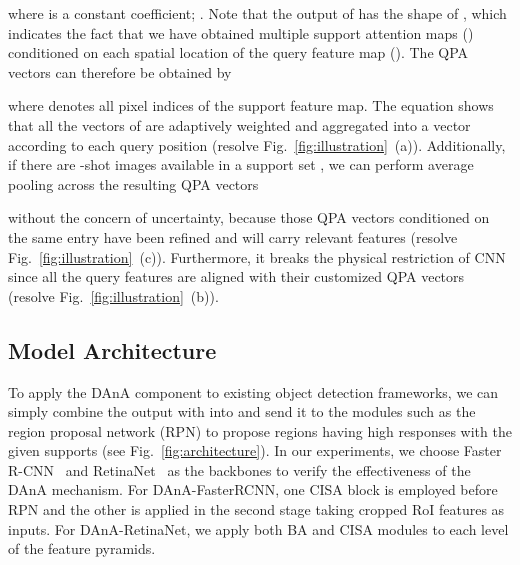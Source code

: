 \documentclass[journal]{IEEEtran}
\begin{document}
where  is a constant coefficient; .
Note that the output of  has the shape of , which indicates the fact that we have obtained multiple support attention maps () conditioned on each spatial location of the query feature map ().
The QPA vectors can therefore be obtained by

where  denotes all pixel indices of the support feature map.
The equation shows that all the vectors of  are adaptively weighted and aggregated into a vector  according to each query position  (resolve Fig.~\ref{fig:illustration}~(a)).
Additionally, if there are -shot images available in a support set , we can perform average pooling across the resulting QPA vectors

without the concern of uncertainty, because those QPA vectors  conditioned on the same entry  have been refined and will carry relevant features (resolve Fig.~\ref{fig:illustration}~(c)).
Furthermore, it breaks the physical restriction of CNN since all the query features are aligned with their customized QPA vectors (resolve Fig.~\ref{fig:illustration}~(b)). 


\subsection{Model Architecture}
\label{section:model_architecture}
To apply the DAnA component to existing object detection frameworks, we can simply combine the output  with  into  and send it to the modules such as the region proposal network (RPN) to propose regions having high responses with the given supports (see Fig.~\ref{fig:architecture}).
In our experiments, we choose Faster R-CNN~\cite{ren2015faster} and RetinaNet~\cite{lin2017focal} as the backbones to verify the effectiveness of the DAnA mechanism.
For DAnA-FasterRCNN, one CISA block is employed before RPN and the other is applied in the second stage taking cropped RoI features as inputs.
For DAnA-RetinaNet, we apply both BA and CISA modules to each level of the feature pyramids.
\end{document}
